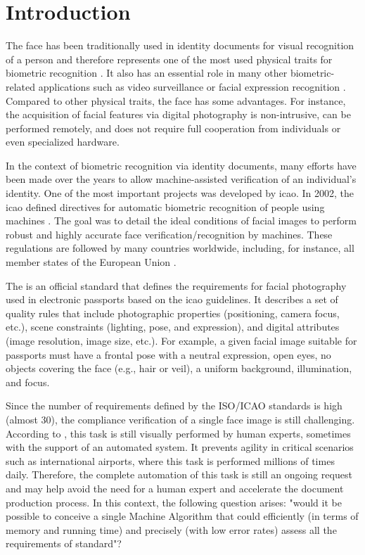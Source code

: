 \section{Introduction}
 
The face has been traditionally used in identity documents for visual recognition of a person and therefore represents one of the most used physical traits for biometric recognition \citep{ferrara2012face}. It also has an essential role in many other biometric-related applications such as video surveillance \citep{de2015partially} or facial expression recognition \citep{anil2016literature}. Compared to other physical traits, the face has some advantages. For instance, the acquisition of facial features via digital photography is non-intrusive, can be performed remotely, and does not require full cooperation from individuals or even specialized hardware.
 
In the context of biometric recognition via identity documents, many efforts have been made over the years to allow machine-assisted verification of an individual's identity. One of the most important projects was developed by \acf{icao}. In 2002, the \acs{icao} defined directives for automatic biometric recognition of people using machines \citep{icao2003report}. The goal was to detail the ideal conditions of facial images to perform robust and highly accurate face verification/recognition by machines. These regulations are followed by many countries worldwide, including, for instance, all member states of the European Union \citep{ebinger2008international}.
 
The \icao \citep{iso-iec} is an official standard that defines the requirements for facial photography used in electronic passports based on the \acs{icao} guidelines. It describes a set of quality rules that include photographic properties (positioning, camera focus, etc.), scene constraints (lighting, pose, and expression), and digital attributes (image resolution, image size, etc.). For example, a given facial image suitable for passports must have a frontal pose with a neutral expression, open eyes, no objects covering the face (e.g., hair or veil), a uniform background, illumination, and focus.
 
Since the number of requirements defined by the ISO/ICAO standards is high (almost 30), the compliance verification of a single face image is still challenging. According to \cite{ferrara2012multi}, this task is still visually performed by human experts, sometimes with the support of an automated system. It prevents agility in critical scenarios such as international airports, where this task is performed millions of times daily. Therefore, the complete automation of this task is still an ongoing request and may help avoid the need for a human expert and accelerate the document production process. In this context, the following question arises: "would it be possible to conceive a single Machine Algorithm that could efficiently (in terms of memory and running time) and precisely (with low error rates) assess all the requirements of \icao standard"?
 
